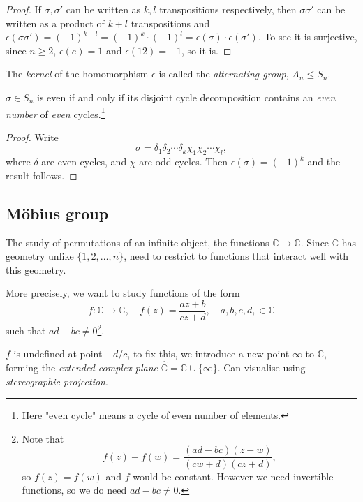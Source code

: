\documentclass[a4paper]{article}
\begin{document}
    \begin{proof}
        If $ \sigma,\sigma' $ can be written as $k,l$ transpositions respectively, then $ \sigma \sigma' $ can be written as a product of $k+l$ transpositions and $ \epsilon(\sigma \sigma')=(-1)^{k+l}=(-1)^k\cdot (-1)^l=\epsilon(\sigma)\cdot \epsilon(\sigma') $. To see it is surjective, since $n\ge 2$, $ \epsilon(e)=1 $ and $ \epsilon(12)=-1 $, so it is.
    \end{proof}
    \begin{definition}
        The \textit{kernel} of the homomorphism $ \epsilon $ is called the \textit{alternating group}, $ A_n \le S_n$.
    \end{definition}
    \begin{proposition}\label{prop:2.21}
        $ \sigma\in S_n $ is even if and only if its disjoint cycle decomposition contains an \textit{even number} of \textit{even} cycles.\footnote{Here "even cycle" means a cycle of even number of elements.}
    \end{proposition}
    \begin{proof}
        Write 
        \[
            \sigma = \delta_1 \delta_2 \cdots \delta_k \chi_1 \chi_2\cdots \chi_{l}
        ,\]
        where $\delta$ are even cycles, and $\chi$ are odd cycles. Then $ \epsilon(\sigma)=(-1)^{k} $ and the result follows.
    \end{proof}
    \subsection{M\"{o}bius group}
    The study of permutations of an infinite object, the functions $ \mathbb{C} \to \mathbb{C} $. Since $\mathbb{C}$ has geometry unlike $ \{1,2,\dots,n\} $, need to restrict to functions that interact well with this geometry.

    More precisely, we want to study functions of the form 
    \[
        f:\mathbb{C} \to \mathbb{C}, \quad f(z)=\frac{az+b}{cz+d},\quad a,b,c,d,\in \mathbb{C} 
    \]
    such that $ad-bc\neq 0$\footnote{Note that \[
        f(z)-f(w)=\frac{(ad-bc)(z-w)}{(cw+d)(cz+d)}
    ,\]
    so $f(z)=f(w)$ and $f$ would be constant. However we need invertible functions, so we do need $ad-bc\neq 0$. }.

    $f$ is undefined at point $-d/c$, to fix this, we introduce a new point $ \infty $ to $ \mathbb{C} $, forming the \textit{extended complex plane} $ \hat{\mathbb{C}}=\mathbb{C} \cup \{\infty\} $. Can visualise using \textit{stereographic projection}.
\end{document}

